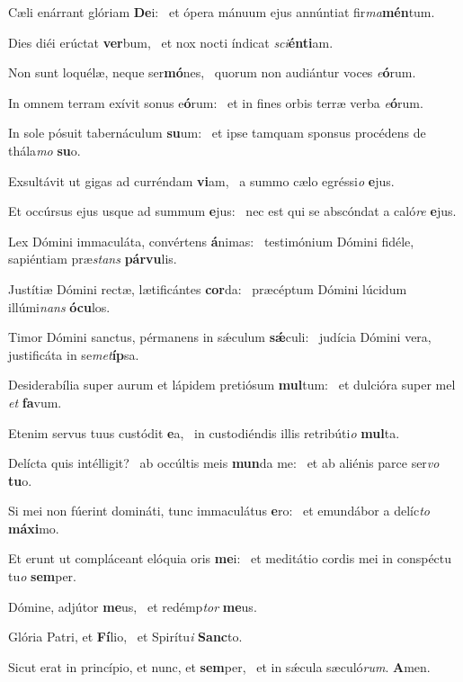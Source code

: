 \item Cæli enárrant glóriam \textbf{De}i:~\psstar{} et ópera mánuum ejus annúntiat fir\textit{ma}\textbf{mén}tum.
\item Dies diéi erúctat \textbf{ver}bum,~\psstar{} et nox nocti índicat \textit{sci}\textbf{én}\textbf{ti}am.
\item Non sunt loquélæ, neque ser\textbf{mó}nes,~\psstar{} quorum non audiántur voces \textit{e}\textbf{ó}rum.
\item In omnem terram exívit sonus e\textbf{ó}rum:~\psstar{} et in fines orbis terræ verba \textit{e}\textbf{ó}rum.
\item In sole pósuit tabernáculum \textbf{su}um:~\psstar{} et ipse tamquam sponsus procédens de thála\textit{mo} \textbf{su}o.
\item Exsultávit ut gigas ad curréndam \textbf{vi}am,~\psstar{} a summo cælo egréssi\textit{o} \textbf{e}jus.
\item Et occúrsus ejus usque ad summum \textbf{e}jus:~\psstar{} nec est qui se abscóndat a caló\textit{re} \textbf{e}jus.
\item Lex Dómini immaculáta, convértens \textbf{á}nimas:~\psstar{} testimónium Dómini fidéle, sapiéntiam præ\textit{stans} \textbf{pár}\textbf{vu}lis.
\item Justítiæ Dómini rectæ, lætificántes \textbf{cor}da:~\psstar{} præcéptum Dómini lúcidum illúmi\textit{nans} \textbf{ó}\textbf{cu}los.
\item Timor Dómini sanctus, pérmanens in sǽculum \textbf{sǽ}culi:~\psstar{} judícia Dómini vera, justificáta in se\textit{met}\textbf{íp}sa.
\item Desiderabília super aurum et lápidem pretiósum \textbf{mul}tum:~\psstar{} et dulcióra super mel \textit{et} \textbf{fa}vum.
\item Etenim servus tuus custódit \textbf{e}a,~\psstar{} in custodiéndis illis retribúti\textit{o} \textbf{mul}ta.
\item Delícta quis intélligit?~\pscross{} ab occúltis meis \textbf{mun}da me:~\psstar{} et ab aliénis parce ser\textit{vo} \textbf{tu}o.
\item Si mei non fúerint domináti, tunc immaculátus \textbf{e}ro:~\psstar{} et emundábor a delíc\textit{to} \textbf{má}\textbf{xi}mo.
\item Et erunt ut compláceant elóquia oris \textbf{me}i:~\psstar{} et meditátio cordis mei in conspéctu tu\textit{o} \textbf{sem}per.
\item Dómine, adjútor \textbf{me}us,~\psstar{} et redémp\textit{tor} \textbf{me}us.
\item Glória Patri, et \textbf{Fí}lio,~\psstar{} et Spirítu\textit{i} \textbf{Sanc}to.
\item Sicut erat in princípio, et nunc, et \textbf{sem}per,~\psstar{} et in sǽcula sæculó\textit{rum}. \textbf{A}men.
